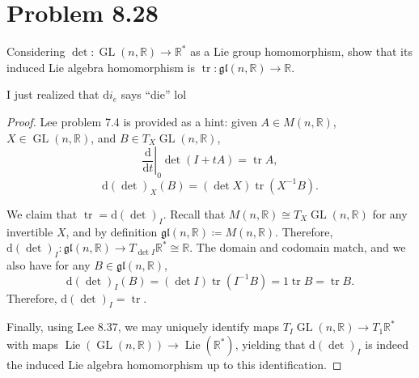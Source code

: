 \documentclass[11pt, letterpaper]{article}
\begin{document}
\section{Problem 8.28}
\begin{problem}
	Considering $\det : \operatorname{GL} (n,\mathbb{R} ) \to \mathbb{R} ^*$ as a Lie group homomorphism, show that its induced Lie algebra homomorphism is $\operatorname{tr} : \mathfrak{gl} (n,\mathbb{R} ) \to \mathbb{R} $.
\end{problem}
\begin{remark}
	I just realized that $\mathrm{d} i_e$ says ``die'' lol
\end{remark}
\begin{proof}
	Lee problem 7.4 is provided as a hint: given $A\in M(n,\mathbb{R} )$, $X\in \operatorname{GL} (n,\mathbb{R} )$, and $B\in T_X \operatorname{GL} (n,\mathbb{R} )$,
	\[
		\left.\frac{\mathrm{d}}{\mathrm{d}t} \right|_0 \det (I+tA)=\operatorname{tr} A,
	\]
	\[
		\mathrm{d} (\det )_X(B)=(\det X)\operatorname{tr} (X ^{-1} B)
	.\]

	We claim that $\operatorname{tr}=\mathrm{d} (\det )_I$. Recall that $M(n,\mathbb{R} )\cong T_X \operatorname{GL} (n,\mathbb{R} )$ for any invertible $X$, and by definition $\mathfrak{gl} (n,\mathbb{R} )\coloneqq M(n,\mathbb{R} )$. Therefore, $\mathrm{d} (\det )_I : \mathfrak{gl} (n,\mathbb{R} ) \to T_{\det I} \mathbb{R} ^* \cong \mathbb{R} $. The domain and codomain match, and we also have for any $B\in \mathfrak{gl} (n,\mathbb{R} )$,
	\[
		\mathrm{d} (\det )_I(B)=(\det I)\operatorname{tr} (I^{-1} B)=1 \operatorname{tr} B=\operatorname{tr} B
	.\]
	Therefore, $\mathrm{d} (\det )_I=\operatorname{tr} $.

	Finally, using Lee 8.37, we may uniquely identify maps $T_I \operatorname{GL} (n,\mathbb{R} )\to T_1\mathbb{R} ^*$ with maps $\operatorname{Lie} (\operatorname{GL} (n,\mathbb{R} )) \to \operatorname{Lie} (\mathbb{R} ^*)$, yielding that $\mathrm{d} (\det )_I$ is indeed the induced Lie algebra homomorphism up to this identification.
\end{proof}
\end{document}
